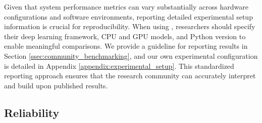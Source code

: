 
Given that system performance metrics can vary substantially across hardware configurations and software environments, reporting detailed experimental setup information is crucial for reproducibility.
When using \method, researchers should specify their deep learning framework, CPU and GPU models, and Python version to enable meaningful comparisons.
We provide a guideline for reporting results in Section \ref{ssec:community_benchmarking}, and our own experimental configuration is detailed in Appendix \ref{appendix:experimental_setup}. This standardized reporting approach ensures that the research community can accurately interpret and build upon published results.

\subsection{Reliability}
\label{ssec:reliability}

